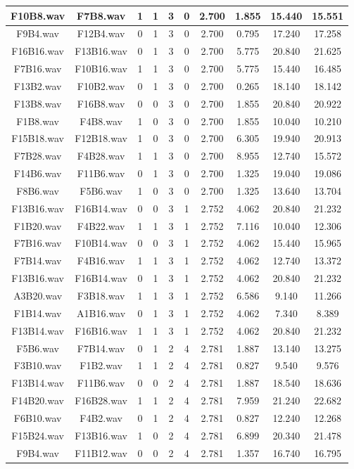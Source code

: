 \documentclass[11pt,a4paper]{book}
\begin{document}
\begin{longtable}[c]{|c|c|c|c|c|c|c|c|c|c|}
F10B8.wav&F7B8.wav&1&1&3&0&2.700&1.855&15.440&15.551\\ \hline
F9B4.wav&F12B4.wav&0&1&3&0&2.700&0.795&17.240&17.258\\ \hline
F16B16.wav&F13B16.wav&0&1&3&0&2.700&5.775&20.840&21.625\\ \hline
F7B16.wav&F10B16.wav&1&1&3&0&2.700&5.775&15.440&16.485\\ \hline
F13B2.wav&F10B2.wav&0&1&3&0&2.700&0.265&18.140&18.142\\ \hline
F13B8.wav&F16B8.wav&0&0&3&0&2.700&1.855&20.840&20.922\\ \hline
F1B8.wav&F4B8.wav&1&0&3&0&2.700&1.855&10.040&10.210\\ \hline
F15B18.wav&F12B18.wav&1&0&3&0&2.700&6.305&19.940&20.913\\ \hline
F7B28.wav&F4B28.wav&1&1&3&0&2.700&8.955&12.740&15.572\\ \hline
F14B6.wav&F11B6.wav&0&1&3&0&2.700&1.325&19.040&19.086\\ \hline
F8B6.wav&F5B6.wav&1&0&3&0&2.700&1.325&13.640&13.704\\ \hline
F13B16.wav&F16B14.wav&0&0&3&1&2.752&4.062&20.840&21.232\\ \hline
F1B20.wav&F4B22.wav&1&1&3&1&2.752&7.116&10.040&12.306\\ \hline
F7B16.wav&F10B14.wav&0&0&3&1&2.752&4.062&15.440&15.965\\ \hline
F7B14.wav&F4B16.wav&1&1&3&1&2.752&4.062&12.740&13.372\\ \hline
F13B16.wav&F16B14.wav&0&1&3&1&2.752&4.062&20.840&21.232\\ \hline
A3B20.wav&F3B18.wav&1&1&3&1&2.752&6.586&9.140&11.266\\ \hline
F1B14.wav&A1B16.wav&0&1&3&1&2.752&4.062&7.340&8.389\\ \hline
F13B14.wav&F16B16.wav&1&1&3&1&2.752&4.062&20.840&21.232\\ \hline
F5B6.wav&F7B14.wav&0&1&2&4&2.781&1.887&13.140&13.275\\ \hline
F3B10.wav&F1B2.wav&1&1&2&4&2.781&0.827&9.540&9.576\\ \hline
F13B14.wav&F11B6.wav&0&0&2&4&2.781&1.887&18.540&18.636\\ \hline
F14B20.wav&F16B28.wav&1&1&2&4&2.781&7.959&21.240&22.682\\ \hline
F6B10.wav&F4B2.wav&0&1&2&4&2.781&0.827&12.240&12.268\\ \hline
F15B24.wav&F13B16.wav&1&0&2&4&2.781&6.899&20.340&21.478\\ \hline
F9B4.wav&F11B12.wav&0&0&2&4&2.781&1.357&16.740&16.795\\ \hline

\end{longtable}
\end{document}
